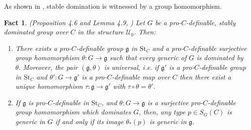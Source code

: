 \documentclass[12pt]{article}
\newcommand{\tpp}{\mathrm{tp}}
\newcommand{\acl}{\mathrm{acl}}
\newcommand{\st}{\mathrm{St}}
\newcommand{\0}{\emptyset}
\newcommand{\rf}{\mathrm{k}}
\newcommand{\U}{\mathcal{U}}
\newcommand{\Ualg}{\mathcal{U}_0}
\def\forkindep{\mathrel{\raise0.2ex\hbox{\ooalign{\hidewidth$\vert$\hidewidth\cr\raise-0.9ex\hbox{$\smile$}}}}}
\theoremstyle{plain}%
\newtheorem{rem}[thm]{Remark}
\newtheorem{fact}[thm]{Fact}
\theoremstyle{definition}
\theoremstyle{remark}
\begin{document}

As shown in \cite{HR19}, stable domination is witnessed by a group homomorphism. %

\begin{fact}\label{homomorphismACVF}
(Proposition 4.6 and Lemma 4.9, \cite{HR19})
  \textit{Let $G$ be a pro-$C$-definable, stably dominated group over $C$ in the structure $\Ualg$. Then:}
    
    \begin{enumerate}
\item \textit{There exists a pro-$C$-definable group $\mathfrak{g}$ in $\st_C$ and a pro-$C$-definable surjective group homomorphism $\theta: G\to\mathfrak{g}$ such that every generic of $G$ is dominated by $\theta.$ Moreover, the pair $(\mathfrak{g},\theta)$ is universal, i.e. if $\mathfrak{g}'$ is a pro-$C$-definable group in $\st_C$ and  $\theta': G\to \mathfrak{g}'$ is a pro-$C$-definable map over $C$ then there exist a unique homomorphism $\tau:\mathfrak{g}\to \mathfrak{g}'$ with $\tau \circ \theta=\theta'$. }

\item \textit{If $\mathfrak{g}$ is pro-$C$-definable in $\st_C$, and $\theta: G \rightarrow \mathfrak{g}$ is a surjective pro-$C$-definable group homomorphism which dominates $G$, then, any type $p \in S_G(C)$ is generic in $G$ if and only if its image $\theta_*(p)$ is generic in $\mathfrak{g}$.}
    \end{enumerate}
\end{fact}
\end{document}
